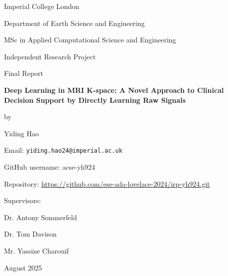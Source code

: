 \documentclass[12pt,a4paper]{article}
\begin{document}
\begin{titlepage}
    \centering
    \vspace*{0cm}

    {\Large Imperial College London\par}
    \vspace{0.5cm}
    {\large Department of Earth Science and Engineering\par}
    \vspace{0.5cm}
    {\large MSc in Applied Computational Science and Engineering\par}

    \vspace{1.8cm}

    {\large Independent Research Project\par}
    {\large Final Report\par}

    \vspace{1.8cm}

    {\Large\bfseries
      Deep Learning in MRI K-space: A Novel Approach to Clinical Decision Support by Directly Learning Raw Signals\par}

    \vspace{1.5cm}

    {\large by\par}
    \vspace{0.0cm}
    {\Large Yiding Hao\par}

    \vspace{1.0cm}

    {\normalsize Email: \texttt{yiding.hao24@imperial.ac.uk}\par}
    {\normalsize GitHub username: acse-yh924\par}
    {\normalsize Repository: \url{https://github.com/ese-ada-lovelace-2024/irp-yh924.git}\par}

    \vspace{0.5cm}

    {\large Supervisors:\par}
    \vspace{0.0cm}
    {\normalsize Dr. Antony Sommerfeld\par}
    {\normalsize Dr. Tom Davison\par}
    {\normalsize Mr. Yassine Charouif\par}

    \vfill
    {\large August 2025\par}
\end{titlepage}
\end{document}
